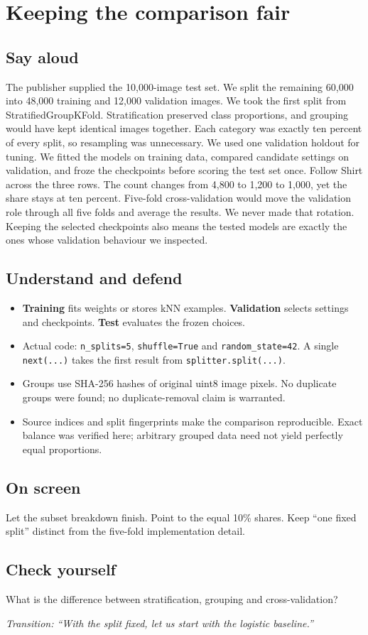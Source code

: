 \documentclass[11pt,a4paper]{article}
\newcommand{\slide}[3]{\clearpage{\small\color{olive}SLIDE #1\hfill Target: #3}\par\section{#2}}
\newcommand{\say}{\subsection{Say aloud}}
\newcommand{\understand}{\subsection{Understand and defend}}
\newcommand{\screen}{\subsection{On screen}}
\newcommand{\selfcheck}[1]{\subsection{Check yourself}#1}
\newcommand{\transition}[1]{\par\smallskip\textit{Transition: #1}}
\begin{document}
\slide{4}{Keeping the comparison fair}{70 seconds}
\say
The publisher supplied the 10,000-image test set. We split the remaining 60,000 into 48,000 training and 12,000 validation images. We took the first split from StratifiedGroupKFold. Stratification preserved class proportions, and grouping would have kept identical images together. Each category was exactly ten percent of every split, so resampling was unnecessary. We used one validation holdout for tuning. We fitted the models on training data, compared candidate settings on validation, and froze the checkpoints before scoring the test set once. Follow Shirt across the three rows. The count changes from 4,800 to 1,200 to 1,000, yet the share stays at ten percent. Five-fold cross-validation would move the validation role through all five folds and average the results. We never made that rotation. Keeping the selected checkpoints also means the tested models are exactly the ones whose validation behaviour we inspected.
\understand
\begin{itemize}
\item \textbf{Training} fits weights or stores kNN examples. \textbf{Validation} selects settings and checkpoints. \textbf{Test} evaluates the frozen choices.
\item Actual code: \texttt{n\_splits=5}, \texttt{shuffle=True} and \texttt{random\_state=42}. A single \texttt{next(...)} takes the first result from \texttt{splitter.split(...)}.
\item Groups use SHA-256 hashes of original uint8 image pixels. No duplicate groups were found; no duplicate-removal claim is warranted.
\item Source indices and split fingerprints make the comparison reproducible. Exact balance was verified here; arbitrary grouped data need not yield perfectly equal proportions.
\end{itemize}
\screen
Let the subset breakdown finish. Point to the equal 10\% shares. Keep ``one fixed split'' distinct from the five-fold implementation detail.
\selfcheck{What is the difference between stratification, grouping and cross-validation?}
\transition{``With the split fixed, let us start with the logistic baseline.''}
\end{document}
